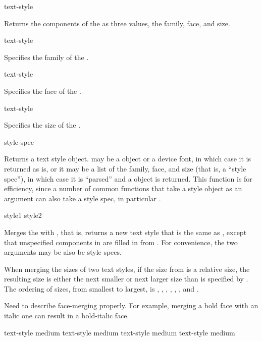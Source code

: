  {text-style}

Returns the components of the   as three
values, the family, face, and size.

 {text-style}

Specifies the family of the  .

 {text-style}

Specifies the face of the  .

 {text-style}

Specifies the size of the  .


 {style-spec}  

Returns a text style object.   may be a  object
or a device font, in which case it is returned as is, or it may be a list of the
family, face, and size (that is, a ``style spec''), in which case it is
``parsed'' and a  object is returned.  This function is for
efficiency, since a number of common functions that take a style object as an
argument can also take a style spec, in particular .


 {style1 style2}

Merges the   with , that is, returns a
new text style that is the same as , except that unspecified
components in  are filled in from .  For convenience,
the two arguments may be also be style specs.

When merging the sizes of two text styles, if the size from  is a
relative size, the resulting size is either the next smaller or next larger size
than is specified by .  The ordering of sizes, from smallest to
largest, is , , , ,
, , and .

 {Need to describe face-merging properly.  For example, merging a
bold face with an italic one can result in a bold-italic face.}


  {text-style medium} 
 {text-style medium}
  {text-style medium}
   {text-style medium}

